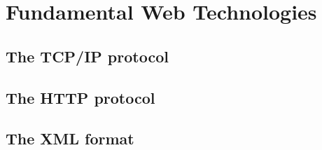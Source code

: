 
\section{Fundamental Web Technologies}
\label{sec:web_fundamentals}

\subsection{The TCP/IP protocol}
\label{subsec:tcp_ip_protocol}


\subsection{The HTTP protocol}
\label{subsec:http_protocol}


\subsection{The XML format}
\label{subsec:xml_format}


